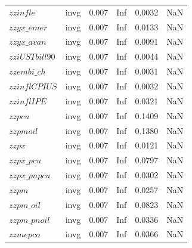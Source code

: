 \begin{center}
\begin{longtable}{llcccc}
$zzinfle$ & invg &   0.007 &    Inf &   0.0032 &     NaN \\ 
$zzyx\_emer$ & invg &   0.007 &    Inf &   0.0133 &     NaN \\ 
$zzyx\_avan$ & invg &   0.007 &    Inf &   0.0091 &     NaN \\ 
$zziUSTbill90$ & invg &   0.007 &    Inf &   0.0044 &     NaN \\ 
$zzembi\_ch$ & invg &   0.007 &    Inf &   0.0031 &     NaN \\ 
$zzinflCPIUS$ & invg &   0.007 &    Inf &   0.0032 &     NaN \\ 
$zzinflIPE$ & invg &   0.007 &    Inf &   0.0321 &     NaN \\ 
$zzpcu$ & invg &   0.007 &    Inf &   0.1409 &     NaN \\ 
$zzpmoil$ & invg &   0.007 &    Inf &   0.1380 &     NaN \\ 
$zzpx$ & invg &   0.007 &    Inf &   0.0121 &     NaN \\ 
$zzpx\_pcu$ & invg &   0.007 &    Inf &   0.0797 &     NaN \\ 
$zzpx\_pnpcu$ & invg &   0.007 &    Inf &   0.0302 &     NaN \\ 
$zzpm$ & invg &   0.007 &    Inf &   0.0257 &     NaN \\ 
$zzpm\_oil$ & invg &   0.007 &    Inf &   0.0823 &     NaN \\ 
$zzpm\_pnoil$ & invg &   0.007 &    Inf &   0.0336 &     NaN \\ 
$zzmepco$ & invg &   0.007 &    Inf &   0.0366 &     NaN \\ 
\end{longtable}
 \end{center}
